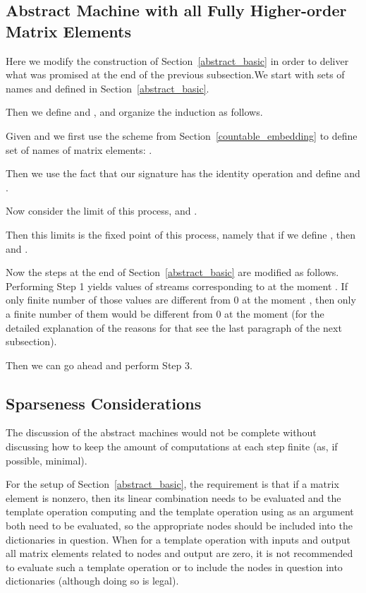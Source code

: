 \documentclass[withtimes]{easychair}
\begin{document}
\subsection{Abstract Machine with all Fully Higher-order Matrix Elements}\label{fully_higher_order}

Here we modify the construction of Section~\ref{abstract_basic} in order to deliver what
was promised at the end of the previous subsection.We start with sets of names  and
 defined in  Section~\ref{abstract_basic}.

Then we define  and , and organize the induction as follows.

Given  and  we first use the scheme from Section~\ref{countable_embedding} to define
set of names of matrix elements: .

Then we use the fact that our signature has the identity operation and define
 and .

Now consider the limit of this process,  and .

Then this limits is the fixed point of this process, namely that if we define\linebreak
, then
 and .

Now the steps at the end of  Section~\ref{abstract_basic} are modified as follows.
Performing Step 1 yields values of streams corresponding to  at the moment .
If only finite number of those values are different from 0 at the moment , then only
a finite number of them would be different from 0 at the moment  (for the detailed explanation
of the reasons for that see the last paragraph of the next subsection).

Then we can go ahead and perform Step 3.

\subsection{Sparseness Considerations}

The discussion of the abstract machines would not be complete without discussing how
to keep the amount of computations at each step finite (as, if possible, minimal).

For the setup of Section~\ref{abstract_basic}, the requirement is that if a matrix
element  is nonzero, then its linear combination needs to be evaluated and the
template operation computing  and the template operation using  as an argument
both need to be evaluated, so the appropriate nodes should be included into the
dictionaries in question. When for a template operation with inputs  and
output  all matrix elements related to nodes  and
output  are zero, it is not recommended to evaluate such a template operation or
to include the nodes in question into dictionaries (although doing so is legal).
\end{document}
